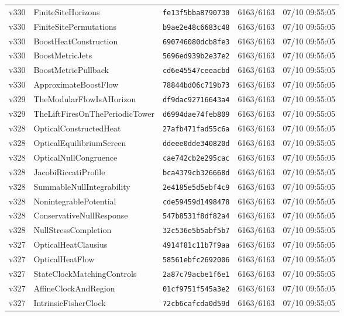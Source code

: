 \documentclass[11pt]{article}
\theoremstyle{definition}\newtheorem{deriv}{Derivação}
\begin{document}
{\begin{longtable}{@{}lllll@{}}
v330 & FiniteSiteHorizons & \texttt{fe13f5bba8790730} & 6163/6163 & 07/10 09:55:05 \\
v330 & FiniteSitePermutations & \texttt{b9ae2e48c6683c48} & 6163/6163 & 07/10 09:55:05 \\
v330 & BoostHeatConstruction & \texttt{690746080dcb8fe3} & 6163/6163 & 07/10 09:55:05 \\
v330 & BoostMetricJets & \texttt{5696ed939b2e37e2} & 6163/6163 & 07/10 09:55:05 \\
v330 & BoostMetricPullback & \texttt{cd6e45547ceeacbd} & 6163/6163 & 07/10 09:55:05 \\
v330 & ApproximateBoostFlow & \texttt{78844bd06c719b73} & 6163/6163 & 07/10 09:55:05 \\
v329 & TheModularFlowIsAHorizon & \texttt{df9dac92716643a4} & 6163/6163 & 07/10 09:55:05 \\
v329 & TheLiftFiresOnThePeriodicTower & \texttt{d6994dae74feb809} & 6163/6163 & 07/10 09:55:05 \\
v328 & OpticalConstructedHeat & \texttt{27afb471fad55c6a} & 6163/6163 & 07/10 09:55:05 \\
v328 & OpticalEquilibriumScreen & \texttt{ddeee0dde340820d} & 6163/6163 & 07/10 09:55:05 \\
v328 & OpticalNullCongruence & \texttt{cae742cb2e295cac} & 6163/6163 & 07/10 09:55:05 \\
v328 & JacobiRiccatiProfile & \texttt{bca4379cb326668d} & 6163/6163 & 07/10 09:55:05 \\
v328 & SummableNullIntegrability & \texttt{2e4185e5d5ebf4c9} & 6163/6163 & 07/10 09:55:05 \\
v328 & NonintegrablePotential & \texttt{cde59459d1498478} & 6163/6163 & 07/10 09:55:05 \\
v328 & ConservativeNullResponse & \texttt{547b8531f8df82a4} & 6163/6163 & 07/10 09:55:05 \\
v328 & NullStressCompletion & \texttt{32c536e5b5abf5b7} & 6163/6163 & 07/10 09:55:05 \\
v327 & OpticalHeatClausius & \texttt{4914f81c11b7f9aa} & 6163/6163 & 07/10 09:55:05 \\
v327 & OpticalHeatFlow & \texttt{58561ebfc2692006} & 6163/6163 & 07/10 09:55:05 \\
v327 & StateClockMatchingControls & \texttt{2a87c79acbe1f6e1} & 6163/6163 & 07/10 09:55:05 \\
v327 & AffineClockAndRegion & \texttt{01cf9751f545a3e2} & 6163/6163 & 07/10 09:55:05 \\
v327 & IntrinsicFisherClock & \texttt{72cb6cafcda0d59d} & 6163/6163 & 07/10 09:55:05 \\

\end{longtable}}
\end{document}
